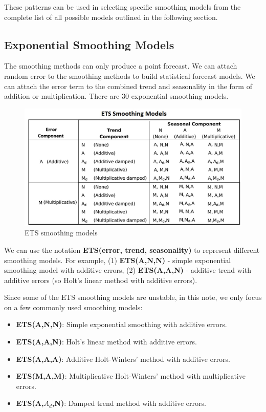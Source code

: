 \documentclass[
]{book}
\begin{document}
These patterns can be used in selecting specific smoothing models from the complete list of all possible models outlined in the following section.

\hypertarget{exponential-smoothing-models}{%
\subsection{Exponential Smoothing Models}\label{exponential-smoothing-models}}

The smoothing methods can only produce a point forecast. We can attach random error to the smoothing methods to build statistical forecast models. We can attach the error term to the combined trend and seasonality in the form of addition or multiplication. There are 30 exponential smoothing models.

\begin{figure}

{\centering \includegraphics[width=0.8\linewidth]{img13/w13-ETS-30-SmoothingModels} 

}

\caption{ETS smoothing models}\label{fig:unnamed-chunk-225}
\end{figure}

We can use the notation \textbf{ETS(error, trend, seasonality)} to represent different smoothing models. For example, (1) \textbf{ETS(A,N,N)} - simple exponential smoothing model with additive errors, (2) \textbf{ETS(A,A,N)} - additive trend with additive errors (so Holt's linear method with additive errors).

Since some of the ETS smoothing models are unstable, in this note, we only focus on a few commonly used smoothing models:

\begin{itemize}
\item
  \textbf{ETS(A,N,N)}: Simple exponential smoothing with additive errors.
\item
  \textbf{ETS(A,A,N)}: Holt's linear method with additive errors.
\item
  \textbf{ETS(A,A,A)}: Additive Holt-Winters' method with additive errors.
\item
  \textbf{ETS(M,A,M)}: Multiplicative Holt-Winters' method with multiplicative errors.
\item
  \textbf{ETS(A,\(A_d\),N)}: Damped trend method with additive errors.
\end{itemize}
\end{document}
